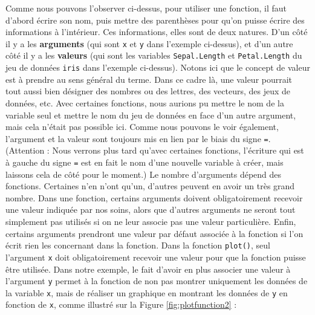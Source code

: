\documentclass[
  french,
]{book}
\newenvironment{Shaded}{\begin{snugshade}}{\end{snugshade}}
\newcommand{\DataTypeTok}[1]{\textcolor[rgb]{0.13,0.29,0.53}{#1}}
\newcommand{\KeywordTok}[1]{\textcolor[rgb]{0.13,0.29,0.53}{\textbf{#1}}}
\newcommand{\NormalTok}[1]{#1}
\newcommand{\OperatorTok}[1]{\textcolor[rgb]{0.81,0.36,0.00}{\textbf{#1}}}
\begin{document}
Comme nous pouvons l'observer ci-dessus, pour utiliser une fonction, il faut d'abord écrire son nom, puis mettre des parenthèses pour qu'on puisse écrire des informations à l'intérieur. Ces informations, elles sont de deux natures. D'un côté il y a les \textbf{arguments} (qui sont \texttt{x} et \texttt{y} dans l'exemple ci-dessus), et d'un autre côté il y a les \textbf{valeurs} (qui sont les variables \texttt{Sepal.Length} et \texttt{Petal.Length} du jeu de données \texttt{iris} dans l'exemple ci-dessus). Notons ici que le concept de valeur est à prendre au sens général du terme. Dans ce cadre là, une valeur pourrait tout aussi bien désigner des nombres ou des lettres, des vecteurs, des jeux de données, etc. Avec certaines fonctions, nous aurions pu mettre le nom de la variable seul et mettre le nom du jeu de données en face d'un autre argument, mais cela n'était pas possible ici. Comme nous pouvons le voir également, l'argument et la valeur sont toujours mis en lien par le biais du signe \texttt{=}. (Attention : Nous verrons plus tard qu'avec certaines fonctions, l'écriture qui est à gauche du signe \texttt{=} est en fait le nom d'une nouvelle variable à créer, mais laissons cela de côté pour le moment.)
Le nombre d'arguments dépend des fonctions. Certaines n'en n'ont qu'un, d'autres peuvent en avoir un très grand nombre. Dans une fonction, certains arguments doivent obligatoirement recevoir une valeur indiquée par nos soins, alors que d'autres arguments ne seront tout simplement pas utilisés si on ne leur associe pas une valeur particulière. Enfin, certains arguments prendront une valeur par défaut associée à la fonction si l'on écrit rien les concernant dans la fonction. Dans la fonction \texttt{plot()}, seul l'argument \texttt{x} doit obligatoirement recevoir une valeur pour que la fonction puisse être utilisée. Dans notre exemple, le fait d'avoir en plus associer une valeur à l'argument \texttt{y} permet à la fonction de non pas montrer uniquement les données de la variable \texttt{x}, mais de réaliser un graphique en montrant les données de \texttt{y} en fonction de \texttt{x}, comme illustré sur la Figure \ref{fig:plotfunction2} :

\begin{Shaded}
\end{Shaded}
\end{document}
